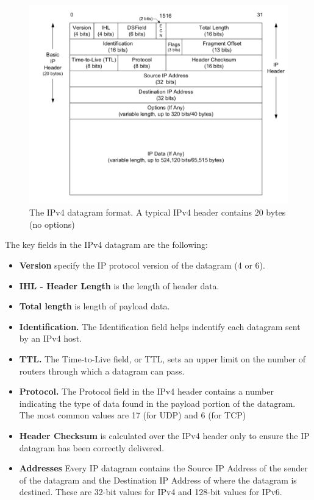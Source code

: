 \documentclass[a4paper, 11pt]{article}
\begin{document}
\begin{figure}[h]
\includegraphics[scale=0.6]{ipv4-datagram-format.png}
\caption{The IPv4 datagram format. A typical IPv4 header contains 20 bytes (no options)}
\label{fig:ipv4-datagram-format}
\end{figure}

The key fields in the IPv4 datagram are the following:\\

\begin{itemize}
\item \textbf{Version} specify the IP protocol version of the datagram (4 or 6).
\item \textbf{IHL - Header Length} is the length of header data.
\item \textbf{Total length} is length of payload data.
\item \textbf{Identification.} The Identification field helps indentify each datagram sent by an IPv4 host.
\item \textbf{TTL.} The Time-to-Live field, or TTL, sets an upper limit on the number of routers through which a datagram can pass.
\item \textbf{Protocol.} The Protocol field in the IPv4 header contains a number indicating the type of data found in the payload portion of the datagram. The most common values are 17 (for UDP) and 6 (for TCP)
\item \textbf{Header Checksum} is calculated over the IPv4 header only to ensure the IP datagram has been correctly delivered.
\item \textbf{Addresses} Every IP datagram contains the Source IP Address of the sender of the datagram and the Destination IP Address of where the datagram is destined. These are 32-bit values for IPv4 and 128-bit values for IPv6. 
\end{itemize}
\end{document}
